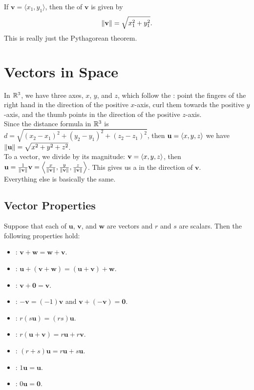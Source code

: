 If \(\mathbf{v} = \langle x_{1},y_{1} \rangle\), then the  of \(\mathbf{v}\) is given by
\[
    \left\lVert \mathbf{v}\right\rVert = \sqrt{x_{1}^{2}+y_{1}^{2}}.
\]
This is really just the Pythagorean theorem.
\newpage

\section{Vectors in Space}

In \(\mathbb{R}^{3}\), we have three axes, \(x\), \(y\), and \(z\), which follow the : point the fingers of the right hand in the direction of the positive \(x\)-axis, curl them towards the positive \(y\)-axis, and the thumb points in the direction of the positive \(z\)-axis. \\

Since the distance formula in \(\mathbb{R}^{3}\) is \(d = \sqrt{(x_{2} - x_{1})^{2} + (y_{2} - y_{1})^{2} + (z_{2} - z_{1})^{2}}\), then \(\mathbf{u} = \left\langle x,y,z \right\rangle\) we have \(\left\lVert \mathbf{u}\right\rVert = \sqrt{x^{2} + y^{2} + z^{2}}\). \\

To  a vector, we divide by its magnitude: \(\mathbf{v} = \left\langle x,y,z \right\rangle\), then \(\mathbf{u} = \frac{1}{\left\lVert \mathbf{v}\right\rVert}\mathbf{v} = \left\langle \frac{x}{\left\lVert \mathbf{v}\right\rVert},\frac{y}{\left\lVert \mathbf{v}\right\rVert},\frac{z}{\left\lVert \mathbf{v}\right\rVert} \right\rangle\). This gives us a  in the direction of \(\mathbf{v}\). \\

Everything else is basically the same.

\subsection{Vector Properties}

Suppose that each of \(\mathbf{u}\), \(\mathbf{v}\), and \(\mathbf{w}\) are vectors and \(r\) and \(s\) are scalars. Then the following properties hold:
\begin{itemize}
    \item {}: \(\mathbf{v} + \mathbf{w} = \mathbf{w} + \mathbf{v}\).
    \item {}: \(\mathbf{u} + (\mathbf{v} + \mathbf{w}) = (\mathbf{u} + \mathbf{v}) + \mathbf{w}\).
    \item {}: \(\mathbf{v} + \mathbf{0} = \mathbf{v}\).
    \item {}: \(-\mathbf{v} = (-1)\mathbf{v}\) and \(\mathbf{v} + (-\mathbf{v}) = \mathbf{0}\).
    \item {}: \(r(s\mathbf{u})= (rs)\mathbf{u}\).
    \item {}: \(r(\mathbf{u} + \mathbf{v}) = r\mathbf{u} + r\mathbf{v}\).
    \item {}: \((r+s)\mathbf{u} = r\mathbf{u} + s\mathbf{u}\).
    \item {}: \(1\mathbf{u} = \mathbf{u}\).
    \item {}: \(0\mathbf{u} = \mathbf{0}\).
\end{itemize}

